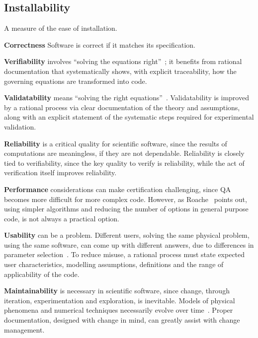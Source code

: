 \documentclass[12pt]{article}
\begin{document}
\subsection*{Installability}

A measure of the ease of installation.


\item [\textbf{Correctness}] Software is correct if it matches its specification.

\item [\textbf{Verifiability}] involves ``solving the equations
  right''~\cite[p.~23]{Roache1998}; it benefits from rational documentation
  that systematically shows, with explicit traceability, how the governing
  equations are transformed into code.

\item [\textbf{Validatability}] means ``solving the right
  equations''~\cite[p.~23]{Roache1998}.  Validatability is improved by a
  rational process via clear documentation of the theory and assumptions, along
  with an explicit statement of the systematic steps required for experimental
  validation.

\item [\textbf{Reliability}] is a critical quality for scientific software,
  since the results of computations are meaningless, if they are not dependable.
  Reliability is closely tied to verifiability, since the key quality to verify
  is reliability, while the act of verification itself improves reliability.

\item [\textbf{Performance}] considerations can make certification challenging,
  since QA becomes more difficult for more complex code.  However, as
  Roache~\cite[p.~355]{Roache1998} points out, using simpler algorithms and
  reducing the number of options in general purpose code, is not always a
  practical option.

\item [\textbf{Usability}] can be a problem.  Different users, solving the same
  physical problem, using the same software, can come up with different answers,
  due to differences in parameter selection~\cite[p.~370]{Roache1998}.  To
  reduce misuse, a rational process must state expected user characteristics,
  modelling assumptions, definitions and the range of applicability of the code.

\item [\textbf{Maintainability}] is necessary in scientific software, since change,
  through iteration, experimentation and exploration, is inevitable.  Models of
  physical phenomena and numerical techniques necessarily evolve over
  time~\cite{CarverEtAl2007, SegalAndMorris2008}.  Proper documentation,
  designed with change in mind, can greatly assist with change management.%
\end{document}
